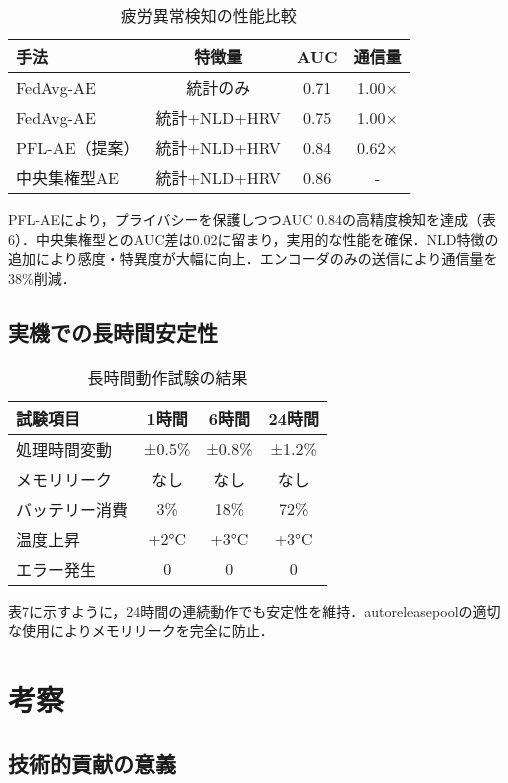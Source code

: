 \documentclass[10pt,twocolumn]{article}
\begin{document}
\begin{CJK}{UTF8}{min}
\begin{table}[t]
\caption{疲労異常検知の性能比較}
\centering
\begin{tabular}{lccc}
\toprule
手法 & 特徴量 & AUC & 通信量 \\
\midrule
FedAvg-AE & 統計のみ & 0.71 & 1.00× \\
FedAvg-AE & 統計+NLD+HRV & 0.75 & 1.00× \\
PFL-AE（提案） & 統計+NLD+HRV & 0.84 & 0.62× \\
中央集権型AE & 統計+NLD+HRV & 0.86 & - \\
\bottomrule
\end{tabular}
\end{table}

PFL-AEにより，プライバシーを保護しつつAUC 0.84の高精度検知を達成（表6）．中央集権型とのAUC差は0.02に留まり，実用的な性能を確保．NLD特徴の追加により感度・特異度が大幅に向上．エンコーダのみの送信により通信量を38\%削減．

\subsection{実機での長時間安定性}

\begin{table}[t]
\caption{長時間動作試験の結果}
\centering
\begin{tabular}{lccc}
\toprule
試験項目 & 1時間 & 6時間 & 24時間 \\
\midrule
処理時間変動 & ±0.5\% & ±0.8\% & ±1.2\% \\
メモリリーク & なし & なし & なし \\
バッテリー消費 & 3\% & 18\% & 72\% \\
温度上昇 & +2°C & +3°C & +3°C \\
エラー発生 & 0 & 0 & 0 \\
\bottomrule
\end{tabular}
\end{table}

表7に示すように，24時間の連続動作でも安定性を維持．autoreleasepoolの適切な使用によりメモリリークを完全に防止．

\section{考察}

\subsection{技術的貢献の意義}


\end{CJK}
\end{document}
